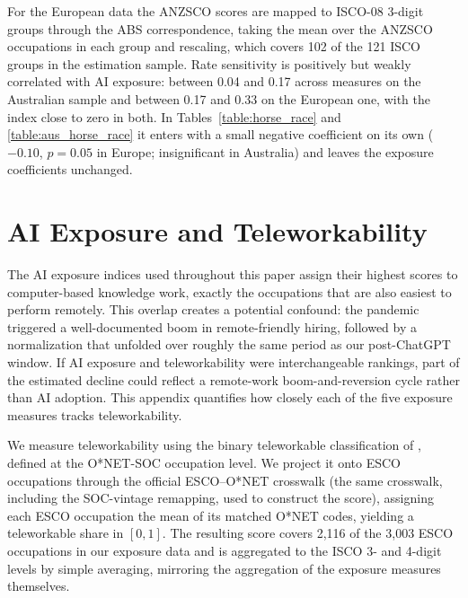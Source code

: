 \documentclass[11pt]{article}
\begin{document}
For the European data the ANZSCO scores are mapped to ISCO-08 3-digit groups through the ABS correspondence, taking the mean over the ANZSCO occupations in each group and rescaling, which covers 102 of the 121 ISCO groups in the estimation sample. Rate sensitivity is positively but weakly correlated with AI exposure: between 0.04 and 0.17 across measures on the Australian sample and between 0.17 and 0.33 on the European one, with the \citet{webb_impact_2022} index close to zero in both. In Tables~\ref{table:horse_race} and \ref{table:aus_horse_race} it enters with a small negative coefficient on its own ($-0.10$, $p = 0.05$ in Europe; insignificant in Australia) and leaves the exposure coefficients unchanged.

\section{AI Exposure and Teleworkability}
\label{sec:wfh}

The AI exposure indices used throughout this paper assign their highest scores to computer-based knowledge work, exactly the occupations that are also easiest to perform remotely. This overlap creates a potential confound: the pandemic triggered a well-documented boom in remote-friendly hiring, followed by a normalization that unfolded over roughly the same period as our post-ChatGPT window. If AI exposure and teleworkability were interchangeable rankings, part of the estimated decline could reflect a remote-work boom-and-reversion cycle rather than AI adoption. This appendix quantifies how closely each of the five exposure measures tracks teleworkability.

We measure teleworkability using the binary teleworkable classification of \citet{dingel2020teleworkable}, defined at the O*NET-SOC occupation level. We project it onto ESCO occupations through the official ESCO--O*NET crosswalk (the same crosswalk, including the SOC-vintage remapping, used to construct the \citet{handa2025economic} score), assigning each ESCO occupation the mean of its matched O*NET codes, yielding a teleworkable share in $[0,1]$. The resulting score covers 2,116 of the 3,003 ESCO occupations in our exposure data and is aggregated to the ISCO 3- and 4-digit levels by simple averaging, mirroring the aggregation of the exposure measures themselves.
\end{document}
